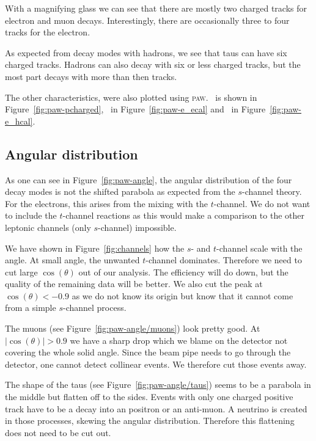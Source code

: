 \documentclass[11pt, english, fleqn, DIV=15, headinclude, BCOR=2cm]{scrreprt}
\begin{document}


With a magnifying glass we can see that there are mostly two charged tracks for
electron and muon decays. Interestingly, there are occasionally three to four
tracks for the electron.

As expected from decay modes with hadrons, we see that taus can have six
charged tracks. Hadrons can also decay with six or less charged tracks, but the
most part decays with more than then tracks.

The other characteristics, were also plotted using \textsc{paw}. \pcharged\ is
shown in Figure~\ref{fig:paw-pcharged}, \eecal\ in Figure~\ref{fig:paw-e_ecal}
and \ehcal\ in Figure~\ref{fig:paw-e_hcal}.

\subsection{Angular distribution}

As one can see in Figure~\ref{fig:paw-angle}, the angular distribution of the
four decay modes is not the shifted parabola as expected from the $s$-channel
theory. For the electrons, this arises from the mixing with the $t$-channel. We
do not want to include the $t$-channel reactions as this would make a
comparison to the other leptonic channels (only $s$-channel) impossible.

We have shown in Figure~\ref{fig:channels} how the $s$- and $t$-channel scale
with the angle. At small angle, the unwanted $t$-channel dominates. Therefore
we need to cut large $\cos(\theta)$ out of our analysis. The efficiency will do
down, but the quality of the remaining data will be better. We also cut the
peak at $\cos(\theta) < -0.9$ as we do not know its origin but know that it
cannot come from a simple $s$-channel process.



The muons (see Figure~\ref{fig:paw-angle/muons}) look pretty good. At
$|\cos(\theta)| > 0.9$ we have a sharp drop which we blame on the detector not
covering the whole solid angle. Since the beam pipe needs to go through the
detector, one cannot detect collinear events. We therefore cut those events
away.

The shape of the taus (see Figure~\ref{fig:paw-angle/taus}) seems to be a
parabola in the middle but flatten off to the sides. Events with only one
charged positive track have to be a decay into an positron or an anti-muon. A
neutrino is created in those processes, skewing the angular distribution.
Therefore this flattening does not need to be cut out.
\end{document}
